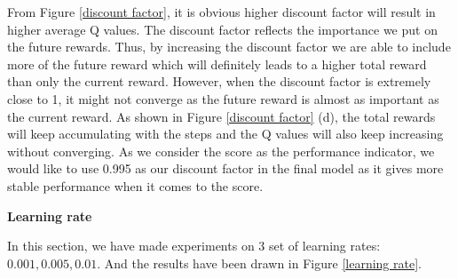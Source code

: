 \documentclass{article}
\begin{document}
From Figure \ref{discount factor}, it is obvious higher discount factor will result in higher average Q
values. The discount factor reflects the importance we put on the future rewards. Thus, by increasing
the discount factor we are able to include more of the future reward which will definitely leads to a
higher total reward than only the current reward. However, when the discount factor is extremely close
to 1, it might not converge as the future reward is almost as important as the current reward. As shown
in Figure \ref{discount factor} (d), the total rewards will keep accumulating with the steps and the Q values
will also keep increasing without converging. As we consider the score as the performance indicator, we
would like to use 0.995 as our discount factor in the final model as it gives more stable performance when it comes to the 
score.

\textbf{Learning rate}

In this section, we have made experiments on 3 set of learning rates: $0.001,0.005,0.01$.
And the results have been drawn in Figure \ref{learning rate}.
\end{document}
